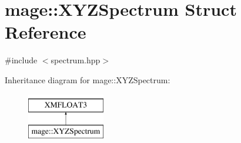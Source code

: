 \hypertarget{structmage_1_1_x_y_z_spectrum}{}\section{mage\+:\+:X\+Y\+Z\+Spectrum Struct Reference}
\label{structmage_1_1_x_y_z_spectrum}


{\ttfamily \#include $<$spectrum.\+hpp$>$}

Inheritance diagram for mage\+:\+:X\+Y\+Z\+Spectrum\+:\begin{figure}[H]
\begin{center}
\leavevmode
\includegraphics[height=2.000000cm]{structmage_1_1_x_y_z_spectrum}
\end{center}
\end{figure}
